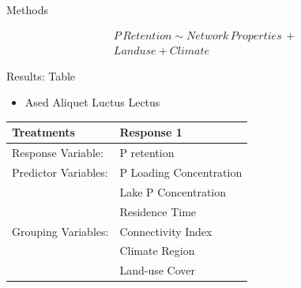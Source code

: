 \documentclass[final,hyperref={pdfpagelabels=false}]{beamer}
\begin{document}
\begin{frame}[t]
\begin{columns}[t]
\begin{column}{.465\textwidth}
\begin{block}{Methods}
\begin{itemize}
\begin{equation*}
\begin{split}
P\, Retention \sim Network\, Properties\, + \\ Landuse + Climate
\end{split}
\end{equation*}

\end{itemize}


\end{block}

{
\begin{block}{Results: Table}

\begin{itemize}
\item Ased Aliquet Luctus Lectus
\end{itemize}

\begin{table}
\begin{tabular}{l l}
\toprule
\textbf{Treatments} & \textbf{Response 1} \\
\midrule
Response Variable: & P retention \\
Predictor Variables: & P Loading Concentration \\
 & Lake P Concentration \\
 & Residence Time \\
Grouping Variables: & Connectivity Index \\
 & Climate Region \\
 & Land-use Cover \\
\bottomrule
\end{tabular}
\end{table}


\end{block}}
\end{column}
\end{columns}
\end{frame}
\end{document}
